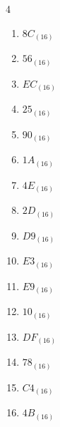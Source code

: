 \begin{multicols}{4}
\begin{enumerate}
  \item $8C_{(16)}$

        \phantom{$=140$}

  \item $56_{(16)}$

        \phantom{$=86$}

  \item $EC_{(16)}$

        \phantom{$=236$}

  \item $25_{(16)}$

        \phantom{$=37$}

  \item $90_{(16)}$

        \phantom{$=144$}

  \item $1A_{(16)}$

        \phantom{$=26$}

  \item $4E_{(16)}$

        \phantom{$=78$}

  \item $2D_{(16)}$

        \phantom{$=45$}

  \item $D9_{(16)}$

        \phantom{$=217$}

  \item $E3_{(16)}$

        \phantom{$=227$}

  \item $E9_{(16)}$

        \phantom{$=233$}

  \item $10_{(16)}$

        \phantom{$=16$}

\columnbreak %

  \item $DF_{(16)}$

        \phantom{$=223$}

  \item $78_{(16)}$

        \phantom{$=120$}

  \item $C4_{(16)}$

        \phantom{$=196$}

  \item $4B_{(16)}$


\end{enumerate}
\end{multicols}
